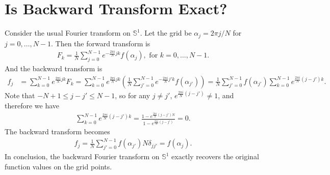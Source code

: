 \documentclass[10pt]{article}
\newcommand{\sph}{\ensuremath{\mathbb{S}}}
\begin{document}
\section{Is Backward Transform Exact?}
Consider the usual Fourier transform on $\sph^1$.
Let the grid be $\alpha_j = 2\pi j/N$ for $j=0,\ldots,N-1$.
Then the forward transform is
\begin{align*}
	F_k = \frac{1}{N} \sum_{j=0}^{N-1} e^{-\frac{2\pi i}{N}jk} f(\alpha_j), \text{ for } k = 0,\ldots,N-1.
\end{align*}
And the backward transform is
\begin{align*}
	f_j &= \sum_{k=0}^{N-1} e^{\frac{2\pi i}{N}jk} F_k = \sum_{k=0}^{N-1} e^{\frac{2\pi i}{N}jk} \left( \frac{1}{N} \sum_{j'=0}^{N-1} e^{-\frac{2\pi i}{N}j'k} f(\alpha_{j'}) \right) = \frac{1}{N} \sum_{j'=0}^{N-1} f(\alpha_{j'}) \sum_{k=0}^{N-1} e^{\frac{2\pi i}{N}(j-j')k}.
\end{align*}
Note that $-N+1 \leq j-j' \leq N-1$, so for any $j\neq j'$, $e^{\frac{2\pi i}{N}(j-j')} \neq 1$, and therefore we have
\begin{align*}
	 \sum_{k=0}^{N-1} e^{\frac{2\pi i}{N}(j-j')k} = \frac{1-e^{\frac{2\pi i}{N}(j-j')N}}{1-e^{\frac{2\pi i}{N}(j-j')}} = 0.
\end{align*}
The backward transform becomes
\begin{align*}
	f_j = \frac{1}{N} \sum_{j'=0}^{N-1} f(\alpha_{j'})N\delta_{jj'} = f(\alpha_j).
\end{align*}
In conclusion, the backward Fourier transform on $\sph^1$ exactly recovers the original function values on the grid points.
\end{document}
